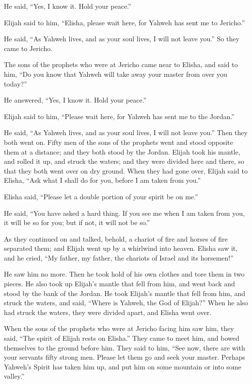He said, ``Yes, I know it. Hold your peace.''

 Elijah said to him, ``Elisha, please wait here, for Yahweh
has sent me to Jericho.''

He said, ``As Yahweh lives, and as your soul lives, I will not leave
you.'' So they came to Jericho.

 The sons of the prophets who were at Jericho came near to
Elisha, and said to him, ``Do you know that Yahweh will take away your
master from over you today?''

He answered, ``Yes, I know it. Hold your peace.''

 Elijah said to him, ``Please wait here, for Yahweh has sent
me to the Jordan.''

He said, ``As Yahweh lives, and as your soul lives, I will not leave
you.'' Then they both went on.  Fifty men of the sons of the
prophets went and stood opposite them at a distance; and they both stood
by the Jordan.  Elijah took his mantle, and rolled it up,
and struck the waters; and they were divided here and there, so that
they both went over on dry ground.  When they had gone over,
Elijah said to Elisha, ``Ask what I shall do for you, before I am taken
from you.''

Elisha said, ``Please let a double portion of your spirit be on me.''

 He said, ``You have asked a hard thing. If you see me when
I am taken from you, it will be so for you; but if not, it will not be
so.''

 As they continued on and talked, behold, a chariot of fire
and horses of fire separated them; and Elijah went up by a whirlwind
into heaven.  Elisha saw it, and he cried, ``My father, my
father, the chariots of Israel and its horsemen!''

He saw him no more. Then he took hold of his own clothes and tore them
in two pieces.  He also took up Elijah's mantle that fell
from him, and went back and stood by the bank of the Jordan.
 He took Elijah's mantle that fell from him, and struck the
waters, and said, ``Where is Yahweh, the God of Elijah?'' When he also
had struck the waters, they were divided apart, and Elisha went over.

 When the sons of the prophets who were at Jericho facing
him saw him, they said, ``The spirit of Elijah rests on Elisha.'' They
came to meet him, and bowed themselves to the ground before him.
 They said to him, ``See now, there are with your servants
fifty strong men. Please let them go and seek your master. Perhaps
Yahweh's Spirit has taken him up, and put him on some mountain or into
some valley.''

